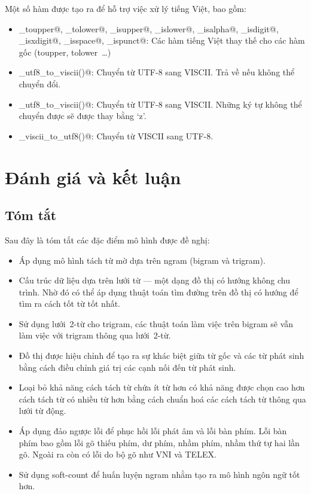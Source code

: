\documentclass[a4paper,oneside,14pt]{extbook} %
\begin{document}
Một số hàm được tạo ra để hỗ trợ việc xử lý tiếng Việt, bao gồm:
\begin{itemize}
\item \verb@viet_toupper@, \verb@viet_tolower@, \verb@viet_isupper@, \verb@viet_islower@,
  \verb@viet_isalpha@, \verb@viet_isdigit@, \verb@viet_isxdigit@, \verb@viet_isspace@,
  \verb@viet_ispunct@: Các hàm tiếng Việt thay thế cho các hàm gốc (toupper,
  tolower~\ldots)
\item \verb@viet_utf8_to_viscii()@: Chuyển từ UTF-8 sang VISCII. Trả
  về \verb@false@ nếu không thể chuyển đổi.
\item \verb@viet_utf8_to_viscii()@: Chuyển từ UTF-8 sang VISCII. Những
  ký tự không thể chuyển được sẽ được thay bằng `z'.
\item \verb@viet_viscii_to_utf8()@: Chuyển từ VISCII sang UTF-8.
\end{itemize}



\chapter{Đánh giá và kết luận}
\label{cha:conclusion}
\minitoc

\section{Tóm tắt}

Sau đây là tóm tắt các đặc điểm mô hình được đề nghị:
\begin{itemize}
\item Áp dụng mô hình tách từ mờ dựa trên n\-gram (bi\-gram và tri\-gram).
\item Cấu trúc dữ liệu dựa trên lưới từ --- một dạng đồ thị có
  hướng không chu trình. Nhờ đó có thể áp dụng thuật toán tìm đường
  trên đồ thị có hướng để tìm ra cách tốt từ tốt nhất.
\item Sử dụng lưới~2-từ cho tri\-gram, các thuật toán làm việc trên
  bi\-gram sẽ vẫn làm việc với tri\-gram thông qua lưới~2-từ.
\item Đồ thị được hiệu chỉnh để tạo
  ra sự khác biệt giữa từ gốc và các từ phát sinh bằng cách điều chỉnh
  giá trị các cạnh nối đến từ phát sinh. 
\item Loại bỏ khả năng cách tách từ
  chứa ít từ hơn có khả năng được chọn cao hơn cách tách từ có nhiều từ
  hơn bằng cách chuẩn hoá các cách tách từ thông qua lưới từ động.
\item Áp dụng đảo ngược lỗi để phục hồi lỗi phát âm và lỗi bàn
  phím. Lỗi bàn phím bao gồm lỗi gõ thiếu phím, dư phím, nhầm phím,
  nhầm thứ tự hai lần gõ. Ngoài ra còn có lỗi do bộ gõ như VNI và
  TELEX.
\item Sử dụng soft-count để huấn luyện n\-gram nhằm tạo ra mô hình ngôn
  ngữ tốt hơn.
\end{itemize}
\end{document}
